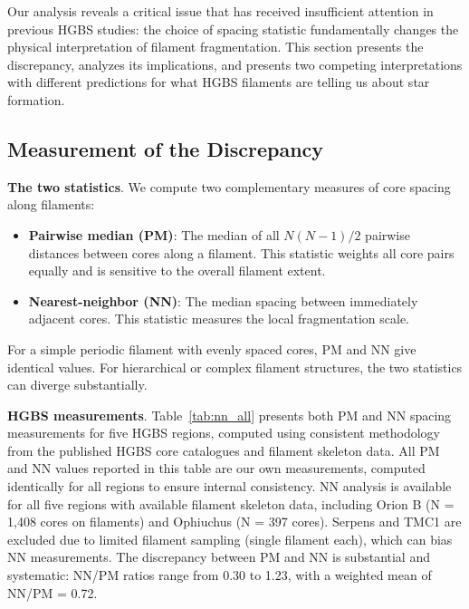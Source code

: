 \documentclass[twoside,twocolumn]{mnras}
\begin{document}
Our analysis reveals a critical issue that has received insufficient attention in previous HGBS studies: the choice of spacing statistic fundamentally changes the physical interpretation of filament fragmentation. This section presents the discrepancy, analyzes its implications, and presents two competing interpretations with different predictions for what HGBS filaments are telling us about star formation.

\subsection{Measurement of the Discrepancy}

\textbf{The two statistics}. We compute two complementary measures of core spacing along filaments:
\begin{itemize}
    \item \textbf{Pairwise median (PM)}: The median of all $N(N-1)/2$ pairwise distances between cores along a filament. This statistic weights all core pairs equally and is sensitive to the overall filament extent.
    \item \textbf{Nearest-neighbor (NN)}: The median spacing between immediately adjacent cores. This statistic measures the local fragmentation scale.
\end{itemize}

For a simple periodic filament with evenly spaced cores, PM and NN give identical values. For hierarchical or complex filament structures, the two statistics can diverge substantially.

\textbf{HGBS measurements}. Table~\ref{tab:nn_all} presents both PM and NN spacing measurements for five HGBS regions, computed using consistent methodology from the published HGBS core catalogues and filament skeleton data. All PM and NN values reported in this table are our own measurements, computed identically for all regions to ensure internal consistency. NN analysis is available for all five regions with available filament skeleton data, including Orion B (N = 1,408 cores on filaments) and Ophiuchus (N = 397 cores). Serpens and TMC1 are excluded due to limited filament sampling (single filament each), which can bias NN measurements. The discrepancy between PM and NN is substantial and systematic: NN/PM ratios range from 0.30 to 1.23, with a weighted mean of NN/PM = 0.72.
\end{document}
